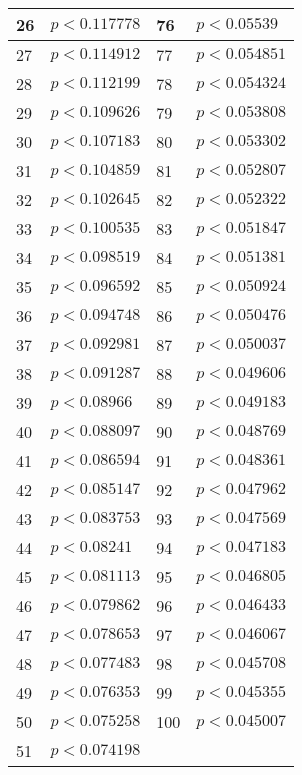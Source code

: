\begin{longtable}{p{3cm}p{5cm}p{3cm}p{5cm}}
26&$p<0.117778$&76&$p<0.05539$\\\midrule
27&$p<0.114912$&77&$p<0.054851$\\\midrule
28&$p<0.112199$&78&$p<0.054324$\\\midrule
29&$p<0.109626$&79&$p<0.053808$\\\midrule
30&$p<0.107183$&80&$p<0.053302$\\\midrule
31&$p<0.104859$&81&$p<0.052807$\\\midrule
32&$p<0.102645$&82&$p<0.052322$\\\midrule
33&$p<0.100535$&83&$p<0.051847$\\\midrule
34&$p<0.098519$&84&$p<0.051381$\\\midrule
35&$p<0.096592$&85&$p<0.050924$\\\midrule
36&$p<0.094748$&86&$p<0.050476$\\\midrule
37&$p<0.092981$&87&$p<0.050037$\\\midrule
38&$p<0.091287$&88&$p<0.049606$\\\midrule
39&$p<0.08966$&89&$p<0.049183$\\\midrule
40&$p<0.088097$&90&$p<0.048769$\\\midrule
41&$p<0.086594$&91&$p<0.048361$\\\midrule
42&$p<0.085147$&92&$p<0.047962$\\\midrule
43&$p<0.083753$&93&$p<0.047569$\\\midrule
44&$p<0.08241$&94&$p<0.047183$\\\midrule
45&$p<0.081113$&95&$p<0.046805$\\\midrule
46&$p<0.079862$&96&$p<0.046433$\\\midrule
47&$p<0.078653$&97&$p<0.046067$\\\midrule
48&$p<0.077483$&98&$p<0.045708$\\\midrule
49&$p<0.076353$&99&$p<0.045355$\\\midrule
50&$p<0.075258$&100&$p<0.045007$\\\midrule
51&$p<0.074198$&&\\
\bottomrule
\end{longtable}

